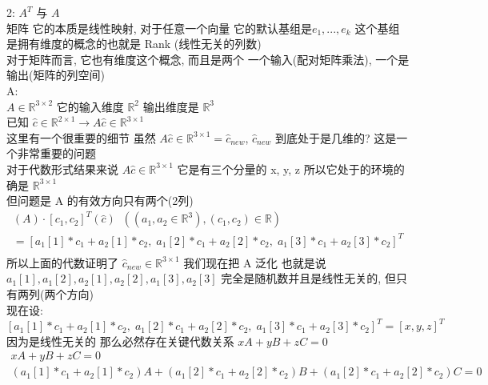\documentclass[12pt]{article}
\begin{document}
\begin{flushleft}
    2: $A^{T}$ 与 $A$  \\
    矩阵 它的本质是线性映射, 对于任意一个向量 它的默认基组是${e_{1}, ... , e_{k}}$ 这个基组是拥有维度的概念的也就是 Rank (线性无关的列数)\\
    对于矩阵而言, 它也有维度这个概念, 而且是两个 一个输入(配对矩阵乘法), 一个是输出(矩阵的列空间) \\
    A: \\
    $A \in \mathbb{R}^{3 \times 2}$ 它的输入维度 $\mathbb{R}^{2}$  输出维度是 $\mathbb{R}^{3}$ \\
    已知 $\hat{c} \in \mathbb{R}^{2 \times 1} \to A\hat{c} \in \mathbb{R}^{3 \times 1}$ \\
    这里有一个很重要的细节 虽然 $A\hat{c} \in \mathbb{R}^{3 \times 1} = \hat{c}_{new}$,
    $\hat{c}_{new}$ 到底处于是几维的? 这是一个非常重要的问题 \\
    对于代数形式结果来说  $A\hat{c} \in \mathbb{R}^{3 \times 1}$  它是有三个分量的 x, y, z  所以它处于的环境的确是 $\mathbb{R}^{3 \times 1}$ \\
    但问题是 A 的有效方向只有两个(2列) \\
    \begin{align}
        [a_{1}, a_{2}](A) \cdot [c_{1},c_{2}]^{T}(\hat{c}) \;\; ((a_{1}, a_{2} \in \mathbb{R}^{3}),(c_{1}, c_{2}) \in \mathbb{R})  \\
        =[a_{1}[1] * c_{1} + a_{2}[1] * c_{2}, \; a_{1}[2] * c_{1} + a_{2}[2] * c_{2}, \; a_{1}[3] * c_{1} + a_{2}[3] * c_{2}]^{T} \\
    \end{align}
    所以上面的代数证明了 $\hat{c}_{new} \in \mathbb{R}^{3 \times 1}$
    我们现在把 A 泛化 也就是说 $a_{1}[1], a_{1}[2],a_{2}[1],a_{2}[2],a_{1}[3],a_{2}[3]$ 完全是随机数并且是线性无关的, 但只有两列(两个方向) \\
    现在设: $[a_{1}[1] * c_{1} + a_{2}[1] * c_{2}, \; a_{1}[2] * c_{1} + a_{2}[2] * c_{2}, \; a_{1}[3] * c_{1} + a_{2}[3] * c_{2}]^{T} = [x, y, z]^{T}$ \\
    因为是线性无关的 那么必然存在关键代数关系 $xA + yB + zC = 0$ \\
    \begin{align}
        xA + yB + zC = 0                                                                                                                      \\
        (a_{1}[1] * c_{1} + a_{2}[1] * c_{2})A + (a_{1}[2] * c_{1} + a_{2}[2] * c_{2})B  + (a_{1}[2] * c_{1} + a_{2}[2] * c_{2})C  = 0        \\

\end{align}
\end{flushleft}
\end{document}
